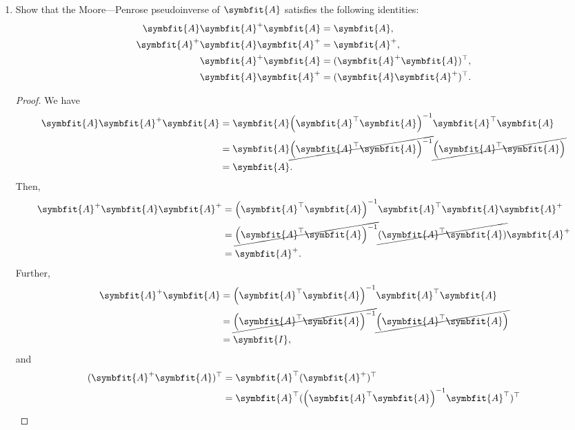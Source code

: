 \documentclass{article}
\theoremstyle{definition}
\newcommand{\mat}[1]{\symbfit{#1}}
\begin{document}
\begin{enumerate}[leftmargin=\labelsep]
	\item Show that the Moore—Penrose pseudoinverse of \(\mat{A}\) satisfies the following identities:
	      \begin{align*}
		      \mat{A}\mat{A}^+\mat{A}   & = \mat{A},                 \\
		      \mat{A}^+\mat{A}\mat{A}^+ & = \mat{A}^+,               \\
		      \mat{A}^+\mat{A}          & = (\mat{A}^+\mat{A})^\top, \\
		      \mat{A}\mat{A}^+          & = (\mat{A}\mat{A}^+)^\top.
	      \end{align*}
	      \begin{proof}
		      We have
		      \begin{align*}
			      \mat{A}\mat{A}^+\mat{A} & = \mat{A}\qty(\mat{A}^{\top}\mat{A})^{-1}\mat{A}^{\top}\mat{A}                          \\
			                              & = \mat{A}\cancel{\qty(\mat{A}^{\top}\mat{A})^{-1}}\cancel{\qty(\mat{A}^{\top}\mat{A}) } \\
			                              & = \mat{A}.
		      \end{align*}
		      Then,
		      \begin{align*}
			      \mat{A}^+\mat{A}\mat{A}^+ & = \qty(\mat{A}^{\top}\mat{A})^{-1}\mat{A}^{\top}\mat{A}\mat{A}^+                     \\
			                                & = \cancel{\qty(\mat{A}^{\top}\mat{A})^{-1}}\cancel{(\mat{A}^{\top}\mat{A})}\mat{A}^+ \\
			                                & = \mat{A}^+.
		      \end{align*}
		      Further,
		      \begin{align*}
			      \mat{A}^+\mat{A} & = \qty(\mat{A}^{\top}\mat{A})^{-1}\mat{A}^{\top}\mat{A}                          \\
			                       & = \cancel{\qty(\mat{A}^{\top}\mat{A})^{-1}}\cancel{\qty(\mat{A}^{\top}\mat{A}) } \\
			                       & = \mat{I},
		      \end{align*}
		      and
		      \begin{align*}
			      (\mat{A}^+\mat{A})^\top & = \mat{A}^{\top} (\mat{A}^+)^{\top}                                                \\
			                              & = \mat{A}^{\top} (\qty(\mat{A}^{\top}\mat{A})^{-1}\mat{A}^{\top})^{\top}           \\

\end{align*}
\end{proof}
\end{enumerate}
\end{document}
